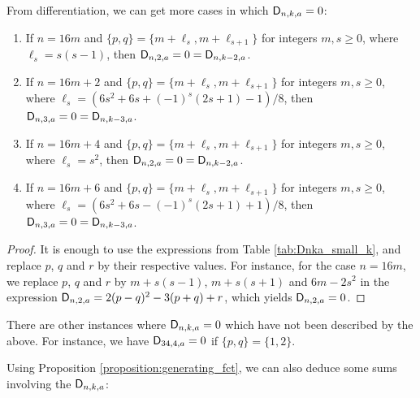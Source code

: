 \documentclass[11pt]{llncs}
\begin{document}
From differentiation, we can get more cases in which $\mathsf{D}_{n,k,a}=0$:

\begin{proposition}\mbox{}
    \begin{enumerate}
        \item If $n=16m$ and $\{p,q\}=\{m+\ell_s,m+\ell_{s+1}\}$ for integers $m,s\geq 0$, where $\ell_s=s(s-1)$, then $\mathsf{D}_{n,2,a}=0=\mathsf{D}_{n,k-2,a}$.
        \item If $n=16m+2$ and $\{p,q\}=\{m+\ell_s,m+\ell_{s+1}\}$ for integers $m,s\geq 0$, where $\ell_s=\left(6s^2+6s+(-1)^s(2s+1)-1\right)/8$, then $\mathsf{D}_{n,3,a}=0=\mathsf{D}_{n,k-3,a}$.
        \item If $n=16m+4$ and $\{p,q\}=\{m+\ell_s,m+\ell_{s+1}\}$ for integers $m,s\geq 0$, where $\ell_s=s^2$, then $\mathsf{D}_{n,2,a}=0=\mathsf{D}_{n,k-2,a}$.
        \item If $n=16m+6$ and $\{p,q\}=\{m+\ell_s,m+\ell_{s+1}\}$ for integers $m,s\geq 0$, where $\ell_s=\left(6s^2+6s-(-1)^s(2s+1)+1\right)/8$, then $\mathsf{D}_{n,3,a}=0=\mathsf{D}_{n,k-3,a}$.
    \end{enumerate}
\end{proposition}

\begin{proof}
    It is enough to use the expressions from Table \ref{tab:Dnka_small_k}, and replace $p$, $q$ and $r$ by their respective values. For instance, for the case $n=16m$, we replace $p$, $q$ and $r$ by $m+s(s-1)$, $m+s(s+1)$ and $6m-2s^2$ in the expression $\mathsf{D}_{n,2,a}=2(p-q)^2-3(p+q)+r$, which yields $\mathsf{D}_{n,2,a}=0$.
\end{proof}

\begin{remark}
    There are other instances where $\mathsf{D}_{n,k,a}=0$ which have not been described by the above. For instance, we have $\mathsf{D}_{34,4,a}=0$ if $\{p,q\}=\{1,2\}$.
\end{remark}

Using Proposition \ref{proposition:generating_fct}, we can also deduce some sums involving the $\mathsf{D}_{n,k,a}$:
\end{document}
